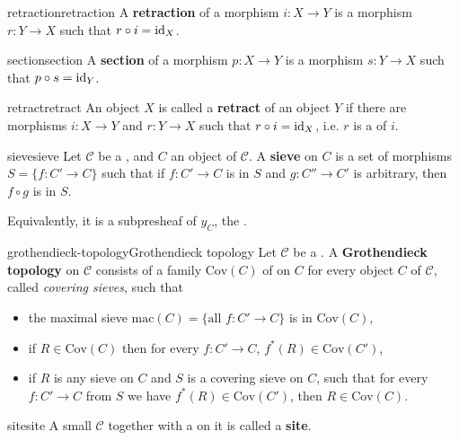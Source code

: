 \begin{topic}{retraction}{retraction}
    A \textbf{retraction} of a morphism $i : X \to Y$ is a morphism $r : Y \to X$ such that $r \circ i = \text{id}_X$.
\end{topic}

\begin{topic}{section}{section}
    A \textbf{section} of a morphism $p : X \to Y$ is a morphism $s : Y \to X$ such that $p \circ s = \text{id}_Y$.
\end{topic}

\begin{topic}{retract}{retract}
    An object $X$ is called a \textbf{retract} of an object $Y$ if there are morphisms $i : X \to Y$ and $r : Y \to X$ such that $r \circ i = \text{id}_X$, i.e. $r$ is a  of $i$.
\end{topic}

\begin{topic}{sieve}{sieve}
    Let $\mathcal{C}$ be a , and $C$ an object of $\mathcal{C}$. A \textbf{sieve} on $C$ is a set of morphisms $S = \{ f : C' \to C \}$ such that if $f : C' \to C$ is in $S$ and $g : C'' \to C'$ is arbitrary, then $f \circ g$ is in $S$.
    
    Equivalently, it is a subpresheaf of $y_C$, the .
\end{topic}

\begin{topic}{grothendieck-topology}{Grothendieck topology}
    Let $\mathcal{C}$ be a . A \textbf{Grothendieck topology} on $\mathcal{C}$ consists of a family $\text{Cov}(C)$ of  on $C$ for every object $C$ of $\mathcal{C}$, called \textit{covering sieves}, such that
    \begin{itemize}
        \item the maximal sieve $\text{mac}(C) = \{ \text{all } f : C' \to C \}$ is in $\text{Cov}(C)$,
        \item if $R \in \text{Cov}(C)$ then for every $f : C' \to C$, $f^*(R) \in \text{Cov}(C')$,
        \item if $R$ is any sieve on $C$ and $S$ is a covering sieve on $C$, such that for every $f : C' \to C$ from $S$ we have $f^*(R) \in \text{Cov}(C')$, then $R \in \text{Cov}(C)$.
    \end{itemize}
\end{topic}

\begin{topic}{site}{site}
    A small  $\mathcal{C}$ together with a  on it is called a \textbf{site}.
\end{topic}

